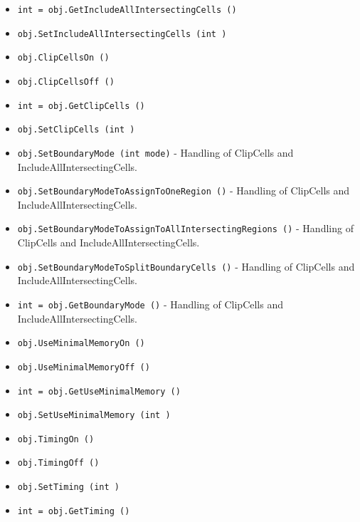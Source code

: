 \begin{itemize}
\item  \verb|int = obj.GetIncludeAllIntersectingCells ()|

\item  \verb|obj.SetIncludeAllIntersectingCells (int )|

\item  \verb|obj.ClipCellsOn ()|

\item  \verb|obj.ClipCellsOff ()|

\item  \verb|int = obj.GetClipCells ()|

\item  \verb|obj.SetClipCells (int )|

\item  \verb|obj.SetBoundaryMode (int mode)| -  Handling of ClipCells and IncludeAllIntersectingCells.

\item  \verb|obj.SetBoundaryModeToAssignToOneRegion ()| -  Handling of ClipCells and IncludeAllIntersectingCells.

\item  \verb|obj.SetBoundaryModeToAssignToAllIntersectingRegions ()| -  Handling of ClipCells and IncludeAllIntersectingCells.

\item  \verb|obj.SetBoundaryModeToSplitBoundaryCells ()| -  Handling of ClipCells and IncludeAllIntersectingCells.

\item  \verb|int = obj.GetBoundaryMode ()| -  Handling of ClipCells and IncludeAllIntersectingCells.

\item  \verb|obj.UseMinimalMemoryOn ()|

\item  \verb|obj.UseMinimalMemoryOff ()|

\item  \verb|int = obj.GetUseMinimalMemory ()|

\item  \verb|obj.SetUseMinimalMemory (int )|

\item  \verb|obj.TimingOn ()|

\item  \verb|obj.TimingOff ()|

\item  \verb|obj.SetTiming (int )|

\item  \verb|int = obj.GetTiming ()|


\end{itemize}
